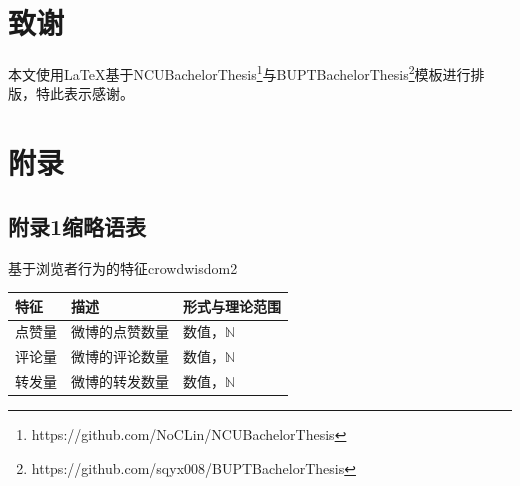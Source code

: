 \documentclass[a4paper,AutoFakeBold,oneside,12pt]{book}
\begin{document}
\clearpage{}
\chapter*{致谢}
\normalsize

{
本文使用\LaTeX{}基于NCUBachelorThesis\footnote{https://github.com/NoCLin/NCUBachelorThesis}与BUPTBachelorThesis\footnote{https://github.com/sqyx008/BUPTBachelorThesis}模板进行排版，特此表示感谢。
}

\setcounter{figure}{0} 
\renewcommand{\thefigure}{~附-\arabic{figure}~}
\setcounter{equation}{0} 
\renewcommand{\theequation}{~附-\arabic{equation}~}
\setcounter{table}{0} 
\renewcommand{\thetable}{~附-\arabic{table}~}
\setcounter{lstlisting}{0} 
\makeatletter
  \renewcommand \thelstlisting
       {附-\@arabic\c@lstlisting}
\makeatother


\chapter*{附录}

{}
\section*{附录1\quad{}缩略语表}

\begin{bupttable}{基于浏览者行为的特征}{crowdwisdom2}
    \begin{tabular}{l|l|l}
        \hline \textbf{特征} & \textbf{描述} & \textbf{形式与理论范围}\\
        \hline 点赞量 & 微博的点赞数量 & 数值，$\mathbb{N}$ \\
        \hline 评论量 & 微博的评论数量 & 数值，$\mathbb{N}$ \\
        \hline 转发量 & 微博的转发数量 & 数值，$\mathbb{N}$ \\
        \hline
    \end{tabular}
\end{bupttable}
\end{document}
